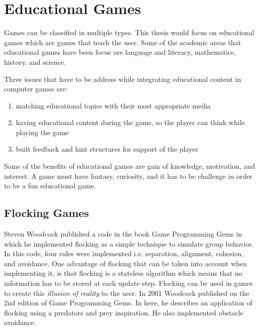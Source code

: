 \section{Educational Games}
Games can be classified in multiple types. This thesis would focus on educational games which are games that teach the user. Some of the academic areas that educational games have been focus are language and literacy, mathematics, history, and science\cite{makingDesignGames}. 

Three issues that have to be address while integrating educational content in computer games are\cite{educationalComputerGames}:
\begin{enumerate}
\item{matching educational topics with their most appropriate media}
\item{having educational content during the game, so the player can think while playing the game}
\item{built feedback and hint structures for support of the player} 
\end{enumerate} 
Some of the benefits of educational games are gain of knowledge, motivation, and interest. A game must have fantasy, curiosity, and it has to be challenge in order to be a fun educational game\cite{computerGamesEducationalTool}.

\subsection{Flocking Games}
Steven Woodcock published a code in the book Game Programming Gems in which he implemented flocking as a simple technique to simulate group behavior\cite{gems1}. In this code, four rules were implemented i.e. separation, alignment, cohesion, and avoidance. One advantage of flocking that can be taken into account when implementing it, is that flocking is a stateless algorithm which means that no information has to be stored at each update step. Flocking can be used in games to create this \textit{illusion of reality} to the user. In 2001 Woodcock published on the 2nd edition of Game Programming Gems. In here, he describes an application of flocking using a predators and prey inspiration\cite{gems2}. He also implemented obstacle avoidance.

